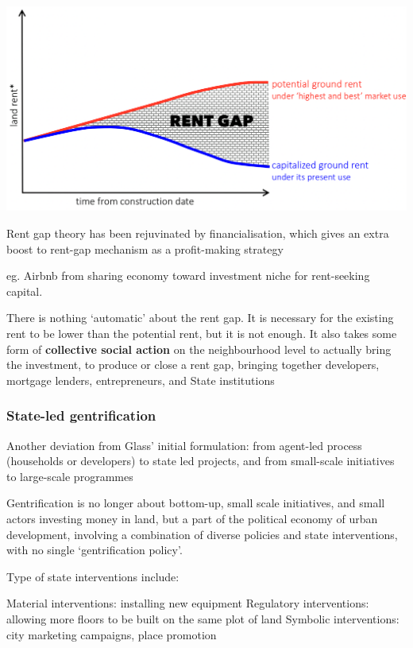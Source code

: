 \documentclass{article}
\begin{document}
\includegraphics[width=\textwidth]{rent_gap_theory}

Rent gap theory has been rejuvinated by financialisation, which gives an extra boost to rent-gap mechanism as a profit-making strategy

eg. Airbnb from sharing economy toward investment niche for rent-seeking capital.

There is nothing `automatic' about the rent gap. It is necessary for the existing rent to be lower than the potential rent, but it is not enough. It also takes some form of \textbf{collective social action} on the neighbourhood level to actually bring the investment, to produce or close a rent gap, bringing together developers, mortgage lenders, entrepreneurs, and State institutions

\subsubsection{State-led gentrification}

Another deviation from Glass' initial formulation: from agent-led process (households or developers) to state led projects, and from small-scale initiatives to large-scale programmes

Gentrification is no longer about bottom-up, small scale initiatives, and small actors investing money in land, but a part of the political economy of urban development, involving a combination of diverse policies and state interventions, with no single `gentrification policy'.

Type of state interventions include:

\begin{outline}
	\1 Material interventions: installing new equipment
	\1 Regulatory interventions: allowing more floors to be built on the same plot of land
	\1 Symbolic interventions: city marketing campaigns, place promotion
\end{outline}
\end{document}
